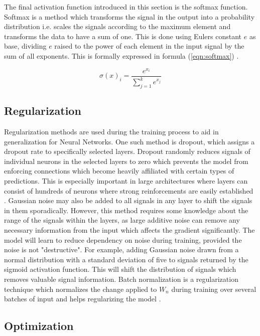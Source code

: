 The final activation function introduced in this section is the softmax function. Softmax is a method which transforms the signal in the output into a probability distribution i.e. scales the signals according to the maximum element and transforms the data to have a sum of one. This is done using Eulers constant $e$ as base, dividing $e$ raised to the power of each element in the input signal by the sum of all exponents. This is formally expressed in formula (\ref{eqn:softmax}) \cite{misra2019mish}.

\begin{equation}
\label{eqn:softmax}
\sigma(x)_i = \frac{e^{x_i}}{\sum_{j=1}^k e^{x_j}}
\end{equation}

\subsection{Regularization}
Regularization methods are used during the training process to aid in generalization for Neural Networks. One such method is dropout, which assigns a dropout rate to specifically selected layers. Dropout randomly reduces signals of individual neurons in the selected layers to zero which prevents the model from enforcing connections which become heavily affiliated with certain types of predictions. This is especially important in large architectures where layers can consist of hundreds of neurons where strong reinforcements are easily established \cite{srivastava2013improving}. Gaussian noise may also be added to all signals in any layer to shift the signals in them sporadically. However, this method requires some knowledge about the range of the signals within the layers, as large additive noise can remove any necessary information from the input which affects the gradient significantly. The model will learn to reduce dependency on noise during training, provided the noise is not "destructive". For example, adding Gaussian noise drawn from a normal distribution with a standard deviation of five to signals returned by the sigmoid activation function. This will shift the distribution of signals which removes valuable signal information. Batch normalization is a regularization technique which normalizes the change applied to $W_n$ during training over several batches of input and helps  regularizing the model \cite{santurkar2018does}.

\subsection{Optimization}

